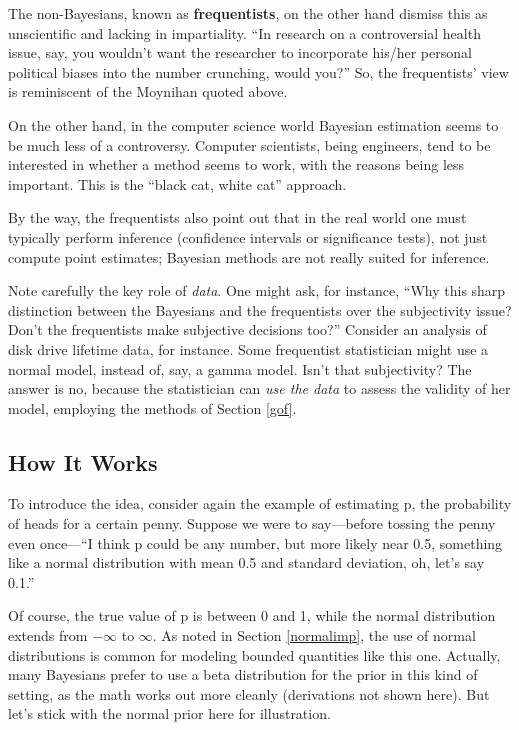 The non-Bayesians, known as {\bf frequentists}, on the other hand
dismiss this as unscientific and lacking in impartiality.  ``In research
on a controversial health issue, say, you wouldn't want the researcher
to incorporate his/her personal political biases into the number
crunching, would you?''  So, the frequentists' view is reminiscent of
the Moynihan quoted above.

On the other hand, in the computer science world Bayesian estimation
seems to be much less of a controversy. Computer scientists, being
engineers, tend to be interested in whether a method seems to work, with
the reasons being less important.  This is the ``black cat, white cat''
approach.

By the way, the frequentists also point out that in the real world one must
typically perform inference (confidence intervals or significance
tests), not just compute point estimates; Bayesian methods are not
really suited for inference.

Note carefully the key role of {\it data}.  One might ask, for instance, ``Why
this sharp distinction between the Bayesians and the frequentists over
the subjectivity issue?  Don't the frequentists make subjective
decisions too?''  Consider an analysis of disk drive lifetime data, for
instance.  Some frequentist statistician might use a normal model,
instead of, say, a gamma model.  Isn't that subjectivity?  The answer is
no, because the statistician can {\it use the data} to assess the
validity of her model, employing the methods of Section \ref{gof}.

\subsection{How It Works}

To introduce the idea, consider again the example of estimating p, the
probability of heads for a certain penny.  Suppose we were to
say---before tossing the penny even once---``I think p could be any
number, but more likely near 0.5, something like a normal distribution
with mean 0.5 and standard deviation, oh, let's say 0.1.''

Of course, the true value of p is between 0 and 1, while the normal
distribution extends from $-\infty$ to $\infty$.  As noted in Section
\ref{normalimp}, the use of normal distributions is common for modeling
bounded quantities like this one.  Actually, many Bayesians prefer
to use a beta distribution for the prior in this kind of setting, as the
math works out more cleanly (derivations not shown here).  But let's
stick with the normal prior here for illustration.

